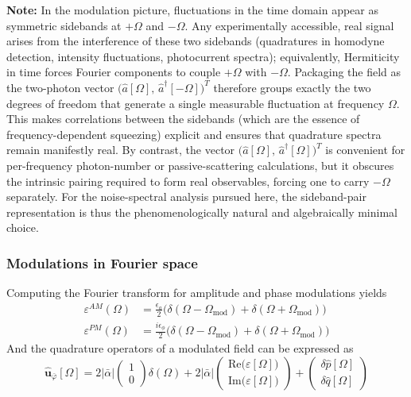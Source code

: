 \noindent\textbf{Note: }
In the modulation picture, fluctuations in the time domain appear as symmetric sidebands at \(+\Omega\) and \(-\Omega\).
Any experimentally accessible, real signal arises from the interference of these two sidebands (quadratures in homodyne detection, intensity fluctuations, photocurrent spectra); equivalently, Hermiticity in time forces Fourier components to couple \(+\Omega\) with \(-\Omega\).
Packaging the field as the two-photon vector \(\big(\hat a[\Omega],\,\hat a^\dagger[-\Omega]\big)^{T}\) therefore groups exactly the two degrees of freedom that generate a single measurable fluctuation at frequency \(\Omega\). This makes correlations between the sidebands (which are the essence of frequency-dependent squeezing) explicit and ensures that quadrature spectra remain manifestly real. By contrast, the vector \(\big(\hat a[\Omega],\,\hat a^\dagger[\Omega]\big)^{T}\) is convenient for per-frequency photon-number or passive-scattering calculations, but it obscures the intrinsic pairing required to form real observables, forcing one to carry \(-\Omega\) separately.
For the noise-spectral analysis pursued here, the sideband-pair representation is thus the phenomenologically natural and algebraically minimal choice.


\subsubsection{Modulations in Fourier space}

Computing the Fourier transform for amplitude and phase modulations yields
\begin{equation}
  \begin{split}
    \varepsilon^{AM}(\Omega) & = \frac{\epsilon_a}{2} \Big(\delta(\Omega - \Omega_{\text{mod}}) +\delta(\Omega + \Omega_{\text{mod}}) \Big)\\
    \varepsilon^{PM}(\Omega) & = \frac{i\epsilon_\phi}{2} \Big(\delta(\Omega - \Omega_{\text{mod}}) + \delta(\Omega + \Omega_{\text{mod}})\Big)
  \end{split}
\end{equation}
And the quadrature operators of a modulated field can be expressed as
\begin{equation}
\mathbf{\hat{\mathbf u}} _{\bar{\varphi}} [\Omega] =2|\bar{\alpha}| \begin{pmatrix}
  1 \\ 0 
\end{pmatrix}\delta(\Omega) + 2|\bar{\alpha}|\begin{pmatrix}
  \mathrm{Re}\big(\varepsilon[\Omega] \big) \\
  \mathrm{Im}\big(\varepsilon[\Omega] \big)
\end{pmatrix}
+ \begin{pmatrix}
  \delta \hat{p}[\Omega] \\
  \delta \hat{q}[\Omega]
\end{pmatrix}
\end{equation}

